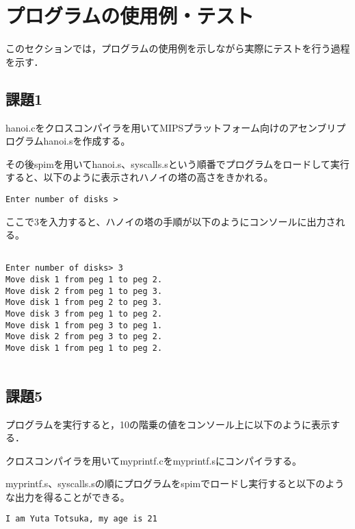 \documentclass[a4j]{jarticle}
\begin{document}
%
%

\section{プログラムの使用例・テスト}

このセクションでは，プログラムの使用例を示しながら実際にテストを行う過程を示す．

\subsection{課題1}

hanoi.cをクロスコンパイラを用いてMIPSプラットフォーム向けのアセンブリプログラムhanoi.sを作成する。　

その後spimを用いてhanoi.s、syscalls.sという順番でプログラムをロードして実行すると、以下のように表示されハノイの塔の高さをきかれる。　

{\baselineskip 3mm
\begin{verbatim}
Enter number of disks > 
\end{verbatim}
}

ここで3を入力すると、ハノイの塔の手順が以下のようにコンソールに出力される。　

{\baselineskip 3mm
\begin{verbatim}

Enter number of disks> 3
Move disk 1 from peg 1 to peg 2.
Move disk 2 from peg 1 to peg 3.
Move disk 1 from peg 2 to peg 3.
Move disk 3 from peg 1 to peg 2.
Move disk 1 from peg 3 to peg 1.
Move disk 2 from peg 3 to peg 2.
Move disk 1 from peg 1 to peg 2.
 
\end{verbatim}
}





\subsection{課題5}

プログラムを実行すると，10の階乗の値をコンソール上に以下のように表示する．

クロスコンパイラを用いてmyprintf.cをmyprintf.sにコンパイラする。　

myprintf.s、syscalls.sの順にプログラムをspimでロードし実行すると以下のような出力を得ることができる。

{\baselineskip 3mm
\begin{verbatim}
I am Yuta Totsuka, my age is 21
\end{verbatim}
}
\end{document}
